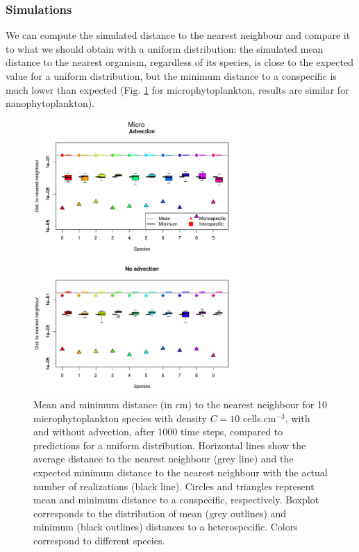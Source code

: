 \documentclass[english]{article}
\begin{document}
\subsubsection*{Simulations}

We can compute the simulated distance to the nearest neighbour and
compare it to what we should obtain with a uniform distribution:
the simulated mean distance to the nearest organism, regardless of
its species, is close to the expected value for a uniform distribution,
but the minimum distance to a conspecific is much lower than expected
(Fig. \ref{fig:Distance_micro} for microphytoplankton, results are
similar for nanophytoplankton).

\begin{figure}[H]
\begin{centering}
\includegraphics[width=0.7\textwidth]{../code/figure/distrib_distance_micro_box_10sp}
\par\end{centering}
\caption{Mean and minimum distance (in cm) to the nearest neighbour for 10
microphytoplankton species with density $C=10$ cells.cm$^{-3}$,
with and without advection, after 1000 time steps, compared to predictions
for a uniform distribution. Horizontal lines show the average distance
to the nearest neighbour (grey line) and the expected minimum distance
to the nearest neighbour with the actual number of realizations (black
line). Circles and triangles represent mean and minimum distance to
a conspecific, respectively. Boxplot corresponds to the distribution
of mean (grey outlines) and minimum (black outlines) distances to
a heterospecific. Colors correspond to different species. \label{fig:Distance_micro}}
\end{figure}
\end{document}
